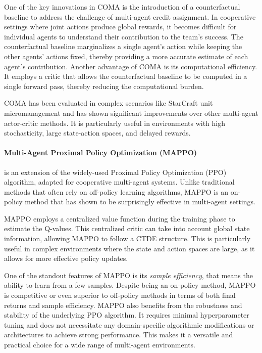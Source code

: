 One of the key innovations in COMA is the introduction of a counterfactual baseline to address the challenge of multi-agent credit assignment. 
 In cooperative settings where joint actions produce global rewards, 
 it becomes difficult for individual agents to understand their contribution to the team's success. 
 The counterfactual baseline marginalizes a single agent's action while keeping the other agents' actions fixed, 
 thereby providing a more accurate estimate of each agent's contribution.
Another advantage of COMA is its computational efficiency.
 It employs a critic that allows the counterfactual baseline to be computed in a single forward pass, 
 thereby reducing the computational burden.

COMA has been evaluated in complex scenarios like StarCraft unit micromanagement and has shown significant improvements over other multi-agent actor-critic methods. 
 It is particularly useful in environments with high stochasticity, 
 large state-action spaces, and delayed rewards.

\paragraph*{Multi-Agent Proximal Policy Optimization (MAPPO)~\cite{mappo}}
 is an extension of the widely-used Proximal Policy Optimization (PPO) algorithm, 
 adapted for cooperative multi-agent systems. 
 Unlike traditional methods that often rely on off-policy learning algorithms, 
 MAPPO is an on-policy method that has shown to be surprisingly effective in multi-agent settings.

MAPPO employs a centralized value function during the training phase to estimate the Q-values.
%
 This centralized critic can take into account global state information, 
 allowing MAPPO to follow a CTDE structure. 
%
 This is particularly useful in complex environments where the state and action spaces are large, 
 as it allows for more effective policy updates.

One of the standout features of MAPPO is its \emph{sample efficiency},
 that means the ability to learn from a few samples. 
 Despite being an on-policy method, 
 MAPPO is competitive or 
 even superior to off-policy methods in terms of both final returns and sample efficiency. 
%
MAPPO also benefits from the robustness and stability of the underlying PPO algorithm. 
 It requires minimal hyperparameter tuning and does not necessitate any domain-specific algorithmic modifications or architectures to achieve strong performance. 
 This makes it a versatile and practical choice for a wide range of multi-agent environments.
